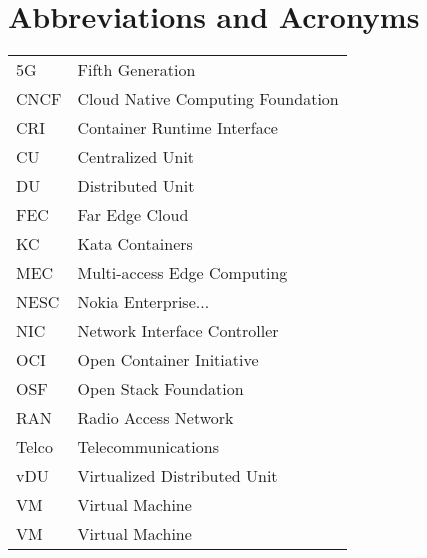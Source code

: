 \chapter*{Abbreviations and Acronyms}

\noindent
\begin{longtable}{@{}p{}p{}@{}}
5G & Fifth Generation \\
CNCF & Cloud Native Computing Foundation \\
CRI & Container Runtime Interface \\
CU & Centralized Unit \\
DU & Distributed Unit \\
FEC & Far Edge Cloud \\
KC & Kata Containers \\
MEC & Multi-access Edge Computing \\
NESC & Nokia Enterprise... \\
NIC & Network Interface Controller \\
OCI & Open Container Initiative \\
OSF & Open Stack Foundation \\
RAN & Radio Access Network \\
Telco & Telecommunications \\
vDU & Virtualized Distributed Unit \\
VM & Virtual Machine \\
VM & Virtual Machine \\



\end{longtable}
